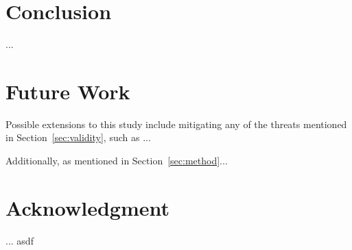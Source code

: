 \documentclass[conference]{IEEEtran}
\begin{document}
\section{Conclusion}\label{sec:conclusion}
...

\section{Future Work}\label{sec:future}
Possible extensions to this study include mitigating any of the threats mentioned in Section~\ref{sec:validity}, such as ...

Additionally, as mentioned in Section~\ref{sec:method}...

\section*{Acknowledgment}
...
asdf \cite{go}



\end{document}
